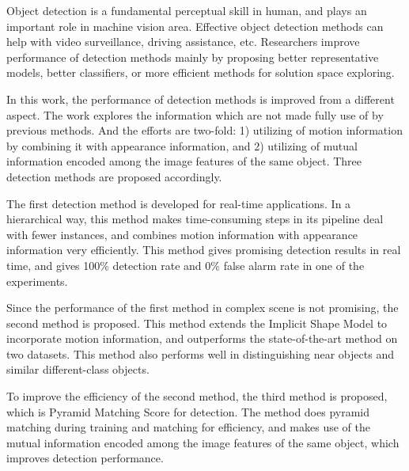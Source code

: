 \begin{eabstract}


Object detection is a fundamental perceptual skill in human, and plays an important role in machine vision area. Effective object detection methods can help with video surveillance, driving assistance, etc. Researchers improve performance of detection methods mainly by proposing better representative models, better classifiers, or more efficient methods for  solution space exploring.

In this work, the performance of detection methods is improved from a different aspect. The work explores the information which are not made fully use of by previous methods. And the efforts are two-fold: 1) utilizing of motion information by combining it   with appearance information, and 2) utilizing of mutual information encoded among the image features of the same object. Three detection methods are proposed accordingly.

The first detection method is developed for real-time applications. In a hierarchical way, this method makes time-consuming steps in its pipeline deal with fewer instances, and combines motion information with appearance information very efficiently. This method gives promising detection results in real time, and gives 100\% detection rate and 0\% false alarm rate in one of the experiments.

Since the performance of the first method in complex scene is not promising, the second method is proposed. This method extends the Implicit Shape Model to incorporate motion information, and outperforms the state-of-the-art method on two datasets. This method also performs well in distinguishing near objects and similar different-class objects.

To improve the efficiency of the second method, the third method is proposed, which is Pyramid Matching Score for detection. The method does pyramid matching during training and matching for efficiency, and makes use of the mutual information encoded among the image features of the same object, which improves detection performance.
\end{eabstract}



